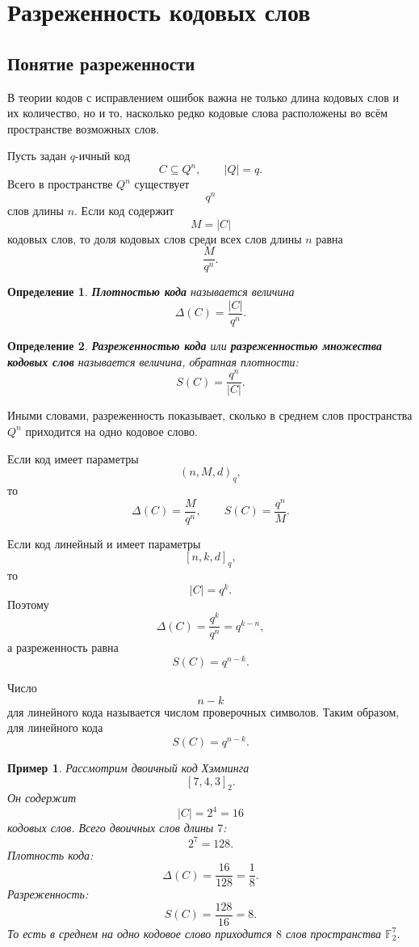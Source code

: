 \documentclass[12pt,a4paper]{article}
\newtheorem{definition}{Определение}[section]
\newtheorem{example}{Пример}[section]
\newcommand{\F}{\mathbb{F}}
\begin{document}
\section{Разреженность кодовых слов}

\subsection{Понятие разреженности}

В теории кодов с исправлением ошибок важна не только длина кодовых слов и их количество, но и то, насколько редко кодовые слова расположены во всём пространстве возможных слов.

Пусть задан $q$-ичный код
\[
    C\subseteq Q^n,
    \qquad |Q|=q.
\]
Всего в пространстве $Q^n$ существует
\[
    q^n
\]
слов длины $n$.
Если код содержит
\[
    M=|C|
\]
кодовых слов, то доля кодовых слов среди всех слов длины $n$ равна
\[
    \frac{M}{q^n}.
\]

\begin{definition}
\textbf{Плотностью кода} называется величина
\[
    \Delta(C)=\frac{|C|}{q^n}.
\]
\end{definition}

\begin{definition}
\textbf{Разреженностью кода} или \textbf{разреженностью множества кодовых слов} называется величина, обратная плотности:
\[
    S(C)=\frac{q^n}{|C|}.
\]
\end{definition}

Иными словами, разреженность показывает, сколько в среднем слов пространства $Q^n$ приходится на одно кодовое слово.

Если код имеет параметры
\[
    (n,M,d)_q,
\]
то
\[
    \Delta(C)=\frac{M}{q^n},
    \qquad
    S(C)=\frac{q^n}{M}.
\]

Если код линейный и имеет параметры
\[
    [n,k,d]_q,
\]
то
\[
    |C|=q^k.
\]
Поэтому
\[
    \Delta(C)=\frac{q^k}{q^n}=q^{k-n},
\]
а разреженность равна
\[
    S(C)=q^{n-k}.
\]

Число
\[
    n-k
\]
для линейного кода называется числом проверочных символов.
Таким образом, для линейного кода
\[
    S(C)=q^{n-k}.
\]

\begin{example}
Рассмотрим двоичный код Хэмминга
\[
    [7,4,3]_2.
\]
Он содержит
\[
    |C|=2^4=16
\]
кодовых слов.
Всего двоичных слов длины $7$:
\[
    2^7=128.
\]
Плотность кода:
\[
    \Delta(C)=\frac{16}{128}=\frac18.
\]
Разреженность:
\[
    S(C)=\frac{128}{16}=8.
\]
То есть в среднем на одно кодовое слово приходится $8$ слов пространства $\F_2^7$.
\end{example}
\end{document}
